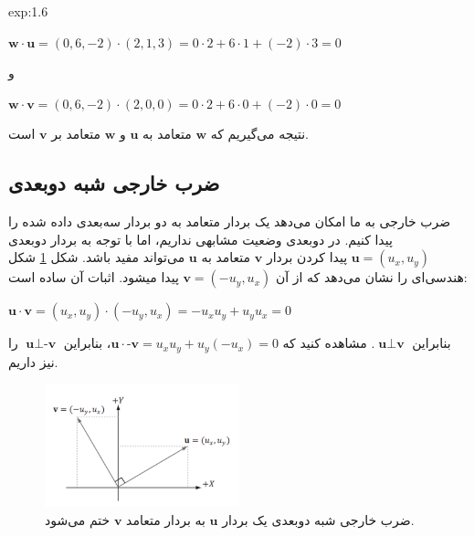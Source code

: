 {\begin{spacing}{1.5}
\begin{example}{exp:1.6}
            \begin{center}
                $\textbf{w}\cdot\textbf{u}=(0,6,-2)\cdot(2,1,3)=0\cdot 2+6\cdot 1+(-2)\cdot 3=0$

                و

                $\textbf{w}\cdot\textbf{v}=(0,6,-2)\cdot(2,0,0)=0\cdot 2+6\cdot 0+(-2)\cdot 0=0$
            \end{center}

            نتیجه می‌گیریم که $\textbf{w}$ متعامد به $\textbf{u}$ و $\textbf{w}$ متعامد بر $\textbf{v}$ است.
        \end{example}
    \end{spacing}
}

\subsection{\textbf{ضرب خارجی شبه دو‌بعدی}}
\label{subsec:1.4.1}
{
    \Large
    \begin{spacing}{1.5}
        ضرب خارجی به ما امکان می‌دهد یک بردار متعامد به دو بردار سه‌بعدی داده شده را پیدا کنیم.
        در دوبعدی وضعیت مشابهی نداریم،
        اما با توجه به بردار دوبعدی $\textbf{u}=(u_{x},u_{y})$ پیدا کردن بردار $\textbf{v}$ متعامد به $\textbf{u}$ می‌تواند مفید باشد.
        شکل \ref{fig:4.Session.1.1.14} شکل هندسی‌ای را نشان می‌دهد که از آن $\textbf{v}=(-u_{y},u_{x})$ پیدا میشود.
        اثبات آن ساده است:

        \begin{center}
            $\textbf{u}\cdot\textbf{v}=(u_{x},u_{y})\cdot(-u_{y},u_{x})=-u_{x}u_{y}+u_{y}u_{x}=0$
        \end{center}

        بنابراین $\textbf{u}\perp\textbf{v}$.
        مشاهده کنید که $\textbf{u}\cdot\textbf{-v}=u_{x}u_{y}+u_{y}(-u_{x})=0$، بنابراین $\textbf{u}\perp\textbf{-v}$ را نیز داریم.

        \begin{figure}[H]
            \centering
            \setlength{\belowcaptionskip}{-10pt}
            \includegraphics[width=0.5\textwidth]{Images/4/1/4.Session.1.1.14}
            \caption{ضرب خارجی شبه دوبعدی یک بردار $\textbf{u}$ به بردار متعامد $\textbf{v}$ ختم می‌شود.}
            \label{fig:4.Session.1.1.14}
        \end{figure}
    \end{spacing}
}

